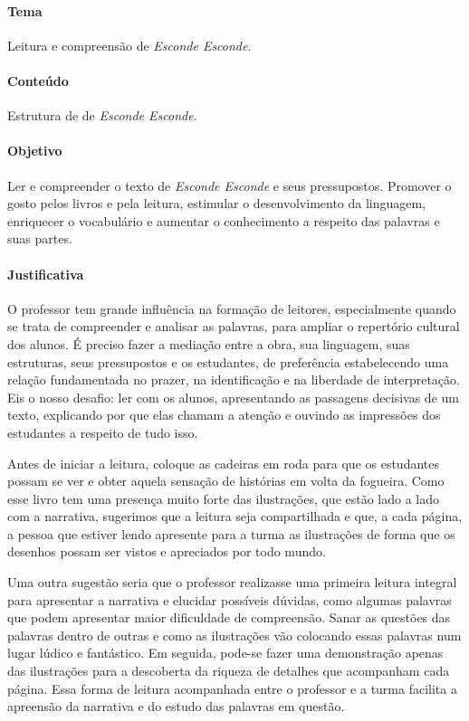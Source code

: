 \documentclass[11pt]{extarticle}
\begin{document}
\paragraph{Tema} Leitura e compreensão de \textit{Esconde Esconde}.

\paragraph{Conteúdo} Estrutura de de \textit{Esconde Esconde}.  

\paragraph{Objetivo} Ler e compreender o texto de \textit{Esconde Esconde} e seus pressupostos. Promover o gosto pelos livros e pela leitura, estimular o desenvolvimento da linguagem, enriquecer o vocabulário e aumentar o conhecimento a respeito das palavras e suas partes.   

\paragraph{Justificativa} O professor tem grande influência na formação de leitores, especialmente quando se trata de compreender e analisar as palavras, para ampliar o repertório cultural dos alunos. É preciso fazer a mediação entre a obra, sua linguagem, suas estruturas, seus pressupostos e os estudantes, de preferência estabelecendo uma relação fundamentada no prazer, na identificação e na liberdade de interpretação. Eis o nosso desafio: ler com os alunos, apresentando as passagens decisivas de um texto, explicando por que elas chamam a atenção e  ouvindo as impressões dos estudantes a respeito de tudo isso.  

Antes de iniciar a leitura, coloque as cadeiras em roda para que os estudantes possam se ver e obter aquela sensação de histórias em volta da fogueira. Como esse livro tem uma presença muito forte das ilustrações, que estão lado a lado com a narrativa, sugerimos que a leitura seja compartilhada e que, a cada página, a pessoa que estiver lendo apresente para a turma as ilustrações de forma que os desenhos possam ser vistos e apreciados por todo mundo. 

Uma outra sugestão seria que o professor realizasse uma primeira leitura integral para apresentar a narrativa e elucidar possíveis dúvidas, como algumas palavras que podem apresentar maior dificuldade de compreensão. Sanar as questões das palavras dentro de outras e como as ilustrações vão colocando essas palavras num lugar lúdico e fantástico. Em seguida, pode-se fazer uma demonstração apenas das ilustrações para a descoberta da riqueza de detalhes que acompanham cada página. Essa forma de leitura acompanhada entre o professor e a turma facilita a apreensão da narrativa e do estudo das palavras em questão.
\end{document}

